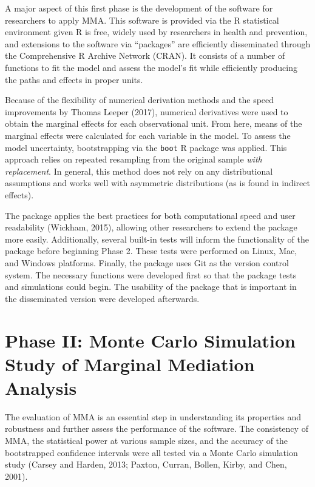 \documentclass[]{DissertateUSU}
\begin{document}
A major aspect of this first phase is the development of the software
for researchers to apply MMA. This software is provided via the R
statistical environment given R is free, widely used by researchers in
health and prevention, and extensions to the software via ``packages''
are efficiently disseminated through the Comprehensive R Archive Network
(CRAN). It consists of a number of functions to fit the model and assess
the model's fit while efficiently producing the paths and effects in
proper units.

Because of the flexibility of numerical derivation methods and the speed
improvements by Thomas Leeper (2017), numerical derivatives were used to
obtain the marginal effects for each observational unit. From here,
means of the marginal effects were calculated for each variable in the
model. To assess the model uncertainty, bootstrapping via the
\texttt{boot} R package was applied. This approach relies on repeated
resampling from the original sample \emph{with replacement}. In general,
this method does not rely on any distributional assumptions and works
well with asymmetric distributions (as is found in indirect effects).

The package applies the best practices for both computational speed and
user readability (Wickham, 2015), allowing other researchers to extend
the package more easily. Additionally, several built-in tests will
inform the functionality of the package before beginning Phase 2. These
tests were performed on Linux, Mac, and Windows platforms. Finally, the
package uses Git as the version control system. The necessary functions
were developed first so that the package tests and simulations could
begin. The usability of the package that is important in the
disseminated version were developed afterwards.

\section{Phase II: Monte Carlo Simulation Study of Marginal Mediation
Analysis}\label{phase-ii-monte-carlo-simulation-study-of-marginal-mediation-analysis}

The evaluation of MMA is an essential step in understanding its
properties and robustness and further assess the performance of the
software. The consistency of MMA, the statistical power at various
sample sizes, and the accuracy of the bootstrapped confidence intervals
were all tested via a Monte Carlo simulation study (Carsey and Harden,
2013; Paxton, Curran, Bollen, Kirby, and Chen, 2001).
\end{document}
